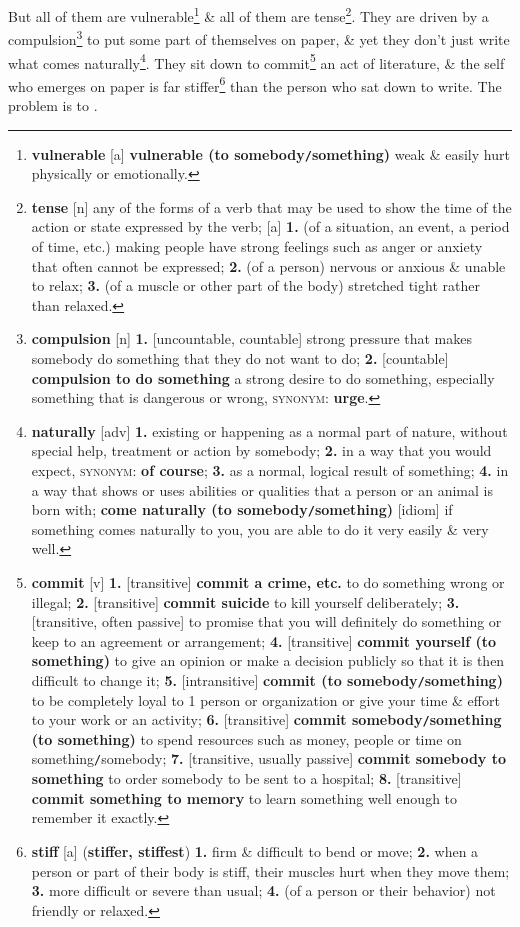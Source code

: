 \documentclass[oneside]{book}
\numberwithin{equation}{section}
\begin{document}
But all of them are vulnerable\footnote{\textbf{vulnerable} [a] \textbf{vulnerable (to somebody\texttt{/}something)} weak \& easily hurt physically or emotionally.} \& all of them are tense\footnote{\textbf{tense} [n] any of the forms of a verb that may be used to show the time of the action or state expressed by the verb; [a] \textbf{1.} (of a situation, an event, a period of time, etc.) making people have strong feelings such as anger or anxiety that often cannot be expressed; \textbf{2.} (of a person) nervous or anxious \& unable to relax; \textbf{3.} (of a muscle or other part of the body) stretched tight rather than relaxed.}. They are driven by a compulsion\footnote{\textbf{compulsion} [n] \textbf{1.} [uncountable, countable] strong pressure that makes somebody do something that they do not want to do; \textbf{2.} [countable] \textbf{compulsion to do something} a strong desire to do something, especially something that is dangerous or wrong, \textsc{synonym}: \textbf{urge}.} to put some part of themselves on paper, \& yet they don't just write what comes naturally\footnote{\textbf{naturally} [adv] \textbf{1.} existing or happening as a normal part of nature, without special help, treatment or action by somebody; \textbf{2.} in a way that you would expect, \textsc{synonym}: \textbf{of course}; \textbf{3.} as a normal, logical result of something; \textbf{4.} in a way that shows or uses abilities or qualities that a person or an animal is born with; \textbf{come naturally (to somebody\texttt{/}something)} [idiom] if something comes naturally to you, you are able to do it very easily \& very well.}. They sit down to commit\footnote{\textbf{commit} [v] \textbf{1.} [transitive] \textbf{commit a crime, etc.} to do something wrong or illegal; \textbf{2.} [transitive] \textbf{commit suicide} to kill yourself deliberately; \textbf{3.} [transitive, often passive] to promise that you will definitely do something or keep to an agreement or arrangement; \textbf{4.} [transitive] \textbf{commit yourself (to something)} to give an opinion or make a decision publicly so that it is then difficult to change it; \textbf{5.} [intransitive] \textbf{commit (to somebody\texttt{/}something)} to be completely loyal to 1 person or organization or give your time \& effort to your work or an activity; \textbf{6.} [transitive] \textbf{commit somebody\texttt{/}something (to something)} to spend resources such as money, people or time on something\texttt{/}somebody; \textbf{7.} [transitive, usually passive] \textbf{commit somebody to something} to order somebody to be sent to a hospital; \textbf{8.} [transitive] \textbf{commit something to memory} to learn something well enough to remember it exactly.} an act of literature, \& the self who emerges on paper is far stiffer\footnote{\textbf{stiff} [a] (\textbf{stiffer, stiffest}) \textbf{1.} firm \& difficult to bend or move; \textbf{2.} when a person or part of their body is stiff, their muscles hurt when they move them; \textbf{3.} more difficult or severe than usual; \textbf{4.} (of a person or their behavior) not friendly or relaxed.} than the person who sat down to write. The problem is to .
\end{document}
